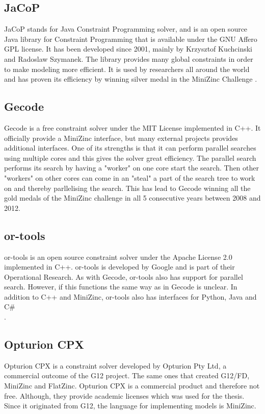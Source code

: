 \subsection{JaCoP}
JaCoP stands for Java Constraint Programming solver, and is an open source Java library for Constraint Programming that is available under the GNU Affero GPL license. It has been developed since 2001, mainly by Krzysztof Kuchcinski and Radoslaw Szymanek. The library provides many global constraints in order to make modeling more efficient. It is used by researchers all around the world and has proven its efficiency by winning silver medal in the MiniZinc Challenge
\cite{jacop_overview}
\cite{jacop_about}.
\subsection{Gecode}
Gecode is a free constraint solver under the MIT License implemented in C++. It officially provide a MiniZinc interface, but many external projects provides additional interfaces. One of its strengths is that it can perform parallel searches using multiple cores and this gives the solver great efficiency. The parallel search performs its search by having a "worker" on one core start the search. Then other "workers" on other cores can come in an "steal" a part of the search tree to work on and thereby parllelising the search. This has lead to Gecode winning all the gold medals of the MiniZinc challenge in all 5 consecutive years between 2008 and 2012.
\cite{gecode}
\subsection{or-tools}
or-tools is an open source constraint solver under the Apache License 2.0 implemented in C++. or-tools is developed by Google and is part of their Operational Research. As with Gecode, or-tools also has support for parallel search. However, if this functions the same way as in Gecode is unclear. In addition to C++ and MiniZinc, or-tools also has interfaces for Python, Java and C\#\\
\cite{or_manual}.
\subsection{Opturion CPX}
Opturion CPX is a constraint solver developed by Opturion Pty Ltd, a commercial outcome of the G12 project. The same ones that created G12/FD, MiniZinc and FlatZinc. Opturion CPX is a commercial product and therefore not free. Although, they provide academic licenses which was used for the thesis. Since it originated from G12, the language for implementing models is MiniZinc.

